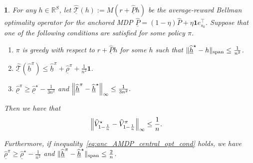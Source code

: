 \documentclass{article}
\theoremstyle{plain}
\theoremstyle{plain}
\newtheorem{lem}[thm]{\protect\lemmaname}
\theoremstyle{remark}
\theoremstyle{plain}
\theoremstyle{plain}
\providecommand{\lemmaname}{Lemma}
\newcommand{\R}{\mathbb{R}}
\newcommand{\Phat}{\widehat{P}}
\newcommand{\Vhat}{\widehat{V}}
\newcommand{\one}{\mathbf{1}}
\newcommand{\rhohat}{\widehat{\rho}}
\newcommand{\hhat}{\widehat{h}}
\newcommand{\Phatanc}{\underline{\Phat}}
\newcommand{\rhohatanc}{ \underline{\rhohat}}
\newcommand{\hhatanc}{\underline{\hhat}}
\newcommand{\Thatanc}{\underline{\widehat{\mathcal{T}}}}
\begin{document}
\begin{lem}
\label{lem:anchored_AMDP_DMDP_opt_cond_relns}
    For any $h \in \R^S$, let $\Thatanc(h) := M(r + \Phatanc h)$ be the average-reward Bellman optimality operator for the anchored MDP $\Phatanc = (1-\eta) \Phat + \eta \one e_{s_0}^\top$.
    Suppose that one of the following conditions are satisfied for some policy $\pi$.
    \begin{enumerate}
        \item $\pi$ is greedy with respect to $r + \Phatanc h$ for some $h$ such that $\spannorm{\hhatanc^\star - h} \leq \frac{1}{n^2}$.

        \item $\Thatanc(\hhatanc^\pi) \leq \hhatanc^\pi + \rhohatanc^\pi + \frac{1}{n^2} \one$.


        \item $\rhohatanc^{\pi} \geq \rhohatanc^\star - \frac{1}{3n^2}$ and $\infnorm{\hhatanc^{\pi} - \hhatanc^\star} \leq \frac{1}{3n^2}.$

    \end{enumerate}
    Then we have that
    \begin{align}
        \infnorm{\Vhat^{\star}_{1-\frac{1}{n}} - \Vhat^{\pi}_{1-\frac{1}{n}}} & \leq \frac{1}{n}. \label{eq:anc_AMDP_central_opt_cond}
    \end{align}

    Furthermore, if inequality~\eqref{eq:anc_AMDP_central_opt_cond} holds, we have $\rhohatanc^{\pi} \geq \rhohatanc^\star - \frac{1}{n^2}$ and $\spannorm{\hhatanc^{\pi} - \hhatanc^\star} \leq \frac{2}{n}$.
\end{lem}
\end{document}

